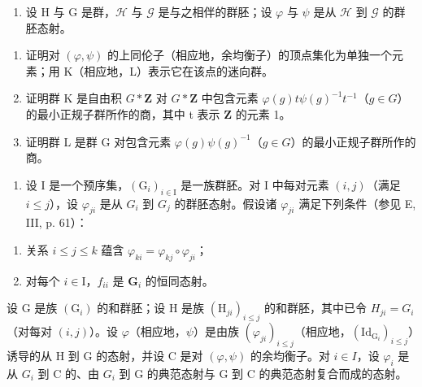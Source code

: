 \begin{enumerate}
\def\labelenumi{\arabic{enumi})}
\setcounter{enumi}{1}
\tightlist
\item
  设 H 与 G 是群，\(\mathcal{H}\) 与 \(\mathcal{G}\) 是与之相伴的群胚；设 \(\varphi\) 与 \(\psi\) 是从 \(\mathcal{H}\) 到 \(\mathcal{G}\) 的群胚态射。
\end{enumerate}

\begin{enumerate}
\def\labelenumi{\alph{enumi})}
\item
  证明对 \((\varphi,\psi)\) 的上同伦子（相应地，余均衡子）的顶点集化为单独一个元素；用 K（相应地，L）表示它在该点的迷向群。
\item
  证明群 K 是自由积 \(G * \mathbf{Z}\) 对 \(G * \mathbf{Z}\) 中包含元素 \(\varphi(g)t\psi(g)^{-1}t^{-1}\)（\(g \in G\)）的最小正规子群所作的商，其中 t 表示 \(\mathbf{Z}\) 的元素 1。
\item
  证明群 L 是群 G 对包含元素 \(\varphi(g)\psi(g)^{-1}\)（\(g \in G\)）的最小正规子群所作的商。
\end{enumerate}

\begin{enumerate}
\def\labelenumi{\arabic{enumi})}
\setcounter{enumi}{2}
\tightlist
\item
  设 I 是一个预序集，\((\mathrm{G}_{i})_{i\in\mathrm{I}}\) 是一族群胚。对 I 中每对元素 \((i,j)\)（满足 \(i\leqslant j\)），设 \(\varphi_{ji}\) 是从 \(G_{i}\) 到 \(G_{j}\) 的群胚态射。假设诸 \(\varphi_{ji}\) 满足下列条件（参见 E, III, p. 61）：
\end{enumerate}

\begin{enumerate}
\def\labelenumi{(\roman{enumi})}
\item
  关系 \(i \leqslant j \leqslant k\) 蕴含 \(\varphi_{ki} = \varphi_{kj} \circ \varphi_{ji}\)；
\item
  对每个 \(i \in \mathrm{I}\)，\(f_{ii}\) 是 \(\mathbf{G}_i\) 的恒同态射。
\end{enumerate}

设 G 是族 \((\mathrm{G}_{i})\) 的和群胚；设 H 是族 \((\mathrm{H}_{ji})_{i\leqslant j}\) 的和群胚，其中已令 \(H_{ji} = G_{i}\)（对每对 \((i,j)\)）。设 \(\varphi\)（相应地，\(\psi\)）是由族 \((\varphi_{ji})_{i\leqslant j}\)（相应地，\((\mathrm{Id}_{\mathrm{G}_{i}})_{i\leqslant j}\)）诱导的从 H 到 G 的态射，并设 C 是对 \((\varphi,\psi)\) 的余均衡子。对 \(i \in I\)，设 \(\varphi_{i}\) 是从 \(G_{i}\) 到 C 的、由 \(G_{i}\) 到 G 的典范态射与 G 到 C 的典范态射复合而成的态射。

